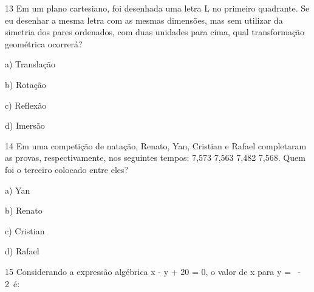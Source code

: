 \num{13} Em um plano cartesiano, foi desenhada uma letra L no primeiro
quadrante. Se eu desenhar a mesma letra com as mesmas dimensões, mas sem
utilizar da simetria dos pares ordenados, com duas unidades para cima,
qual transformação geométrica ocorrerá?

a) Translação

b) Rotação

c) Reflexão

d) Imersão



\num{14} Em uma competição de natação, Renato, Yan, Cristian e Rafael
completaram as provas, respectivamente, nos seguintes tempos: 7,573
7,563 7,482 7,568. Quem foi o terceiro colocado entre eles?

a) Yan

b) Renato

c) Cristian

d) Rafael



\num{15} Considerando a expressão algébrica x - y + 20 = 0, o valor de x
para y = \  - 2\ é:

